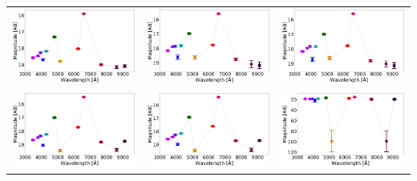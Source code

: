 \begin{table}
\begin{tabular}{ccc}
\includegraphics[width=0.3\linewidth, clip]{photopectrum_splus_MC0115-350934_aper.pdf} & \includegraphics[width=0.3\linewidth, clip]{photopectrum_splus_MC0115-350934_auto.pdf} & \includegraphics[width=0.3\linewidth, clip]{photopectrum_splus_MC0115-350934_petro.pdf} \\
\includegraphics[width=0.3\linewidth, clip]{photopectrum_splus_MC0115-402039_aper.pdf} & \includegraphics[width=0.3\linewidth, clip]{photopectrum_splus_MC0115-402039_auto.pdf} & \includegraphics[width=0.3\linewidth, clip]{photopectrum_splus_MC0115-402039_petro.pdf} \\

\end{tabular}
\end{table}
